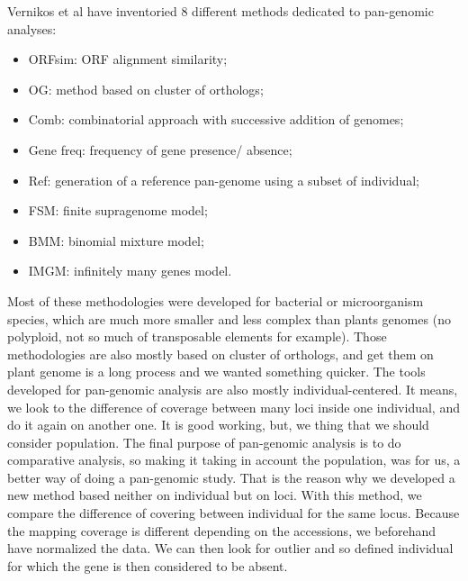 \documentclass[10pt,letterpaper]{article}
\begin{document}
Vernikos et al \cite{Vernikos2015} have inventoried 8 different methods dedicated to pan-genomic analyses:
\begin{itemize}
\item ORFsim: ORF alignment similarity;
\item OG: method based on cluster of orthologs;
\item Comb: combinatorial approach with successive addition of genomes;
\item Gene freq: frequency of gene presence/ absence;
\item Ref: generation of a reference pan-genome using a subset of individual;
\item FSM: finite supragenome model;
\item BMM: binomial mixture model;
\item IMGM: infinitely many genes model.\\
\end{itemize}

Most of these methodologies were developed for bacterial or microorganism species, which are much more smaller and less complex than plants genomes (no polyploid, not so much of transposable elements for example). Those methodologies are also mostly based on cluster of orthologs, and get them on plant genome is a long process and we wanted something quicker. The tools developed for pan-genomic analysis are also mostly individual-centered. It means, we look to the difference of coverage between many loci inside one individual, and do it again on another one. It is good working, but, we thing that we should consider population. The final purpose of pan-genomic analysis is to do comparative analysis, so making it taking in account the population, was for us, a better way of doing a pan-genomic study.  That is the reason why we developed a new method based neither on individual but on loci. With this method, we compare the difference of covering between individual for the same locus. Because the mapping coverage is different depending on the accessions, we beforehand have normalized the data. We can then look for outlier and so defined individual for which the gene is then considered to be absent. 
\end{document}
